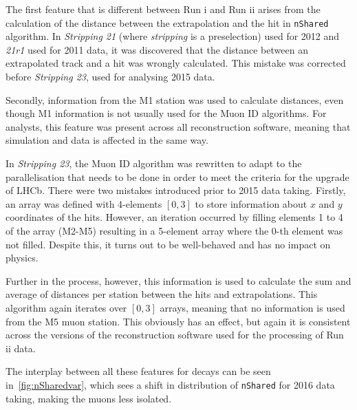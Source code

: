The first feature that is different between Run \Rn{1} and Run \Rn{2} arises from the calculation of the distance between the extrapolation and the hit in \DIFaddbegin {}\DIFaddend \texttt{nShared} algorithm.
In \textit{Stripping 21} (where \textit{stripping} is a preselection) used for 2012 and \textit{21r1} used for 2011 data, it was discovered that the distance between an extrapolated track and a hit was wrongly calculated. This mistake was corrected before \textit{Stripping 23}, used for analysing 2015 data. 

Secondly, information from the M1 station was used to calculate distances, even though M1 information is not usually used for the Muon ID algorithms.  For analysts, this feature was present across all reconstruction software, meaning that simulation and data is affected in the same way.

In \textit{Stripping 23}, the Muon ID algorithm was rewritten to adapt to the parallelisation that needs to be done in order to meet the criteria for the upgrade of \gls{LHCb}. There were two mistakes introduced prior to 2015 data taking.
Firstly, an array was defined with 4-elements $[0,3]$ to store information about \DIFaddbegin {}\DIFaddend $x$ and $y$ coordinates of the hits. However, an iteration occurred by filling elements 1 to 4 of the array (M2-M5\DIFdelbegin {}\DIFdelend ) resulting in a 5-element array where the 0-th element was not filled. Despite this, it turns out to be well-behaved and has no impact on physics. \DIFaddbegin {}\DIFaddend 

Further in the process, however, this information is used to calculate the sum and average of distances per station between the hits and extrapolations. This algorithm again iterates over $[0,3]$ arrays, meaning that no information is used from the M5 muon station. This obviously has an effect, but again it is consistent across the versions of the reconstruction software used for the processing of Run \Rn{2} data.

The interplay between all these features for \bjpsimumuk decays \DIFdelbegin \DIFdel{, }\DIFdelend can be seen in~\autoref{fig:nSharedvar}, which sees a shift in distribution of \texttt{nShared} for 2016 data taking, making the muons less isolated.

